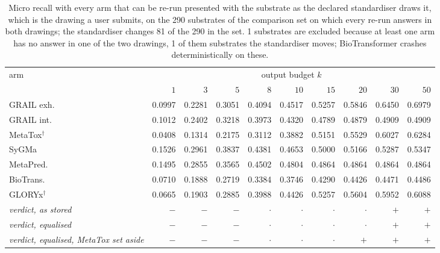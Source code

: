 \begin{table}[t]
\centering\scriptsize
\begin{threeparttable}
\caption{Micro recall with every arm that can be re-run presented with the substrate as the declared standardiser draws it, which is the drawing a user submits, on the 290 substrates of the comparison set on which every re-run answers in both drawings; the standardiser changes 81 of the 290 in the set. 1 substrates are excluded because at least one arm has no answer in one of the two drawings, 1 of them substrates the standardiser moves; BioTransformer crashes deterministically on these.}
\label{tab:si-equalised}
\begin{tabular}{lrrrrrrrrr}
\toprule
arm & \multicolumn{9}{c}{output budget $k$} \\
\cmidrule(lr){2-10}
 & $1$ & $3$ & $5$ & $8$ & $10$ & $15$ & $20$ & $30$ & $50$ \\
\midrule
GRAIL exh. & 0.0997 & 0.2281 & 0.3051 & 0.4094 & 0.4517 & 0.5257 & 0.5846 & 0.6450 & 0.6979 \\
GRAIL int. & 0.1012 & 0.2402 & 0.3218 & 0.3973 & 0.4320 & 0.4789 & 0.4879 & 0.4909 & 0.4909 \\
MetaTox$^{\dagger}$ & 0.0408 & 0.1314 & 0.2175 & 0.3112 & 0.3882 & 0.5151 & 0.5529 & 0.6027 & 0.6284 \\
SyGMa & 0.1526 & 0.2961 & 0.3837 & 0.4381 & 0.4653 & 0.5000 & 0.5166 & 0.5287 & 0.5347 \\
MetaPred. & 0.1495 & 0.2855 & 0.3565 & 0.4502 & 0.4804 & 0.4864 & 0.4864 & 0.4864 & 0.4864 \\
BioTrans. & 0.0710 & 0.1888 & 0.2719 & 0.3384 & 0.3746 & 0.4290 & 0.4426 & 0.4471 & 0.4486 \\
GLORYx$^{\dagger}$ & 0.0665 & 0.1903 & 0.2885 & 0.3988 & 0.4426 & 0.5257 & 0.5604 & 0.5952 & 0.6088 \\
\midrule
\emph{verdict, as stored} & $-$ & $-$ & $-$ & $\cdot$ & $\cdot$ & $\cdot$ & $\cdot$ & $+$ & $+$ \\
\emph{verdict, equalised} & $-$ & $-$ & $-$ & $\cdot$ & $\cdot$ & $\cdot$ & $\cdot$ & $+$ & $+$ \\
\emph{verdict, equalised, MetaTox set aside} & $-$ & $-$ & $-$ & $\cdot$ & $\cdot$ & $\cdot$ & $+$ & $+$ & $+$ \\
\bottomrule
\end{tabular}
\begin{tablenotes}[flushleft]\footnotesize

\end{tablenotes}
\end{threeparttable}
\end{table}
